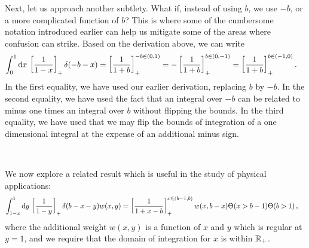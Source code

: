 \begin{subappendices}
\begin{example}{}
\end{example}




Next, let us approach another subtlety.
%
What if, instead of using \(b\), we use \(-b\), or a more complicated function of \(b\)?
%
This is where some of the cumbersome notation introduced earlier can help us mitigate some of the areas where confusion can strike.
%
Based on the derivation above, we can write
\begin{align}
    \int_{0}^{1} \dd x\,\left[\frac{1}{1-x}\right]_+ \delta(-b - x)
    &=
    \left[\frac{1}{1+b}\right]_+^{-b\in(0,1)}
    =
    -\left[\frac{1}{1+b}\right]_+^{b\in(0, -1)}
    =
    \left[\frac{1}{1+b}\right]_+^{b\in(-1, 0)}
    .
\end{align}
In the first equality, we have used our earlier derivation, replacing \(b\) by \(-b\).
%
In the second equality, we have used the fact that an integral over \(-b\) can be related to minus one times an integral over \(b\) without flipping the bounds.
%
In the third equality, we have used that we may flip the bounds of integration of a one dimensional integral at the expense of an additional minus sign.

~\\
\begin{example}{}
    We now explore a related result which is useful in the study of physical applications:
    \begin{align}
        \int_{1-x}^{1} \dd y\,
        \le[\frac{1}{1-y}\ri]_+ \delta(b - x - y) w(x, y)
        &=
        \le[\frac{1}{1+x-b}\ri]^{x \in (b-1,b)}_+
        w(x, b-x)
        \Theta(x > b-1) \Theta(b > 1)
        \label{eq:mixed-bounds_1d_plus-distribution}
        \,,
    \end{align}
    where the additional weight \(w(x,y)\) is a function of \(x\) and \(y\) which is regular at \(y = 1\), and we require that the domain of integration for \(x\) is within \(\mathbb R_+\).


\end{example}
\end{subappendices}
